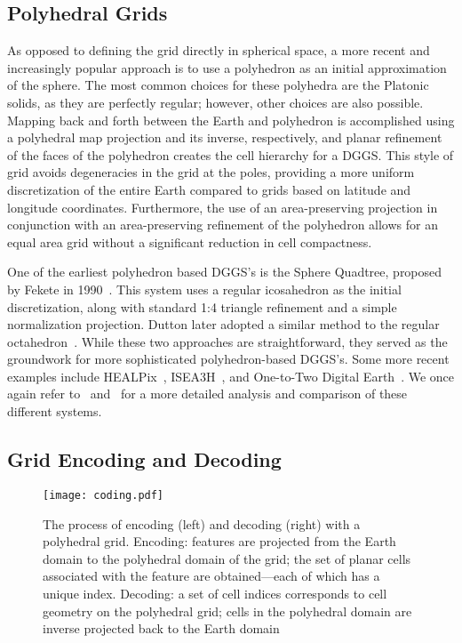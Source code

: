 \subsection{Polyhedral Grids} \label{chap:2:polyhedral}
As opposed to defining the grid directly in spherical space, a more recent and increasingly popular approach is to use a polyhedron as an initial approximation of the sphere.
The most common choices for these polyhedra are the Platonic solids, as they are perfectly regular; however, other choices are also possible.
Mapping back and forth between the Earth and polyhedron is accomplished using a polyhedral map projection and its inverse, respectively, and planar refinement of the faces of the polyhedron creates the cell hierarchy for a DGGS.
This style of grid avoids degeneracies in the grid at the poles, providing a more uniform discretization of the entire Earth compared to grids based on latitude and longitude coordinates.
Furthermore, the use of an area-preserving projection in conjunction with an area-preserving refinement of the polyhedron allows for an equal area grid without a significant reduction in cell compactness.


One of the earliest polyhedron based DGGS's is the Sphere Quadtree, proposed by Fekete in 1990~\cite{fekete1990sphere}.
This system uses a regular icosahedron as the initial discretization, along with standard 1:4 triangle refinement and a simple normalization projection.
Dutton later adopted a similar method to the regular octahedron~\cite{dutton1996encoding}.
While these two approaches are straightforward, they served as the groundwork for more sophisticated polyhedron-based DGGS's.
Some more recent examples include HEALPix~\cite{gorski2005healpix}, ISEA3H~\cite{sahr2003geodesic}, and One-to-Two Digital Earth~\cite{mahdavi2013one}.
We once again refer to~\cite{mahdavi2015survey} and~\cite{alderson2020digital} for a more detailed analysis and comparison of these different systems.


\subsection{Grid Encoding and Decoding} \label{chap:2:coding}

\begin{figure}[tb]
	\texttt{[image: coding.pdf]}
	\caption[Grid Encoding and Decoding with a Polyhedral Grid]{
		The process of encoding (left) and decoding (right) with a polyhedral grid.
		Encoding: features are projected from the Earth domain to the polyhedral domain of the grid; the set of planar cells associated with the feature are obtained---each of which has a unique index.
		Decoding: a set of cell indices corresponds to cell geometry on the polyhedral grid; cells in the polyhedral domain are inverse projected back to the Earth domain
	}
	\label{fig:coding}
\end{figure}


